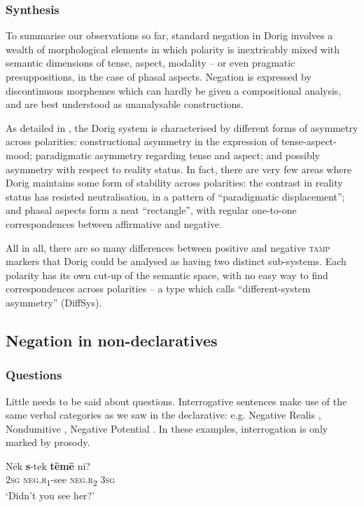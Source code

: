 \documentclass[output=paper,colorlinks,citecolor=brown,draft]{langscibook}
\begin{document}
\subsubsection{Synthesis}\label{sec:dor:2.1.8}

To summarise our observations so far, standard negation in Dorig involves a wealth of morphological elements in which polarity is inextricably mixed with semantic dimensions of tense, aspect, modality – or even pragmatic presuppositions, in the case of phasal aspects. Negation is expressed by discontinuous morphemes which can hardly be given a compositional analysis, and are best understood as unanalysable constructions.

As detailed in , the Dorig system is characterised by different forms of asymmetry across polarities: constructional asymmetry in the expression of tense-aspect-mood; paradigmatic asymmetry regarding tense and aspect; and possibly asymmetry with respect to reality \mbox{status}. In fact, there are very few areas where Dorig maintains some form of stability across polarities: the contrast in reality \mbox{status} has resisted neutralisation, in a pattern of “paradigmatic displacement”; and phasal aspects form a neat “rectangle”, with regular one-to-one correspondences between affirmative and negative.

All in all, there are so many differences between positive and negative \textsc{tamp} markers that Dorig could be analysed as having two distinct sub-systems. Each polarity has its own cut-up of the semantic space, with no easy way to find correspondences across polarities -- a type which \citet[54]{Miestamo2005} calls “different-system asymmetry” (DiffSys).

\subsection{Negation in non-declaratives}
\subsubsection{Questions}

Little needs to be said about questions. Interrogative sentences make use of the same verbal categories as we saw in the declarative: e.g. Negative Realis , Nondumitive , Negative Potential . 
In these examples, interrogation is only marked by prosody.

\ea\label{ex:dor:seeher} 
    \gll  Nēk \textbf{s}-tek \textbf{tēmē} ni?\\ 
          \textsc{2sg} \textsc{neg.r\textsubscript{1}}-see \textsc{neg.r\textsubscript{2}} \textsc{3sg}\\
    \glt ‘Didn’t you see her?’ 
\z 
\end{document}

